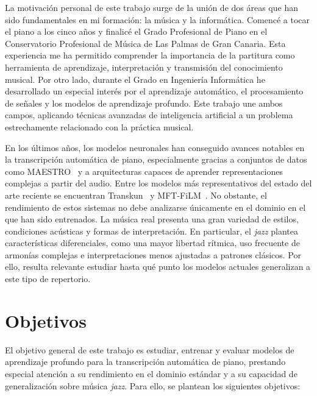 \documentclass[11pt,spanish,listoffigures,listoftables]{tfgetsinf}
\begin{document}
La motivación personal de este trabajo surge de la unión de dos áreas que han
sido fundamentales en mi formación: la música y la informática. Comencé a tocar
el piano a los cinco años y finalicé el Grado Profesional de Piano en el
Conservatorio Profesional de Música de Las Palmas de Gran Canaria. Esta
experiencia me ha permitido comprender la importancia de la partitura como
herramienta de aprendizaje, interpretación y transmisión del conocimiento
musical. Por otro lado, durante el Grado en Ingeniería Informática he
desarrollado un especial interés por el aprendizaje automático, el procesamiento
de señales y los modelos de aprendizaje profundo. Este trabajo une ambos
campos, aplicando técnicas avanzadas de inteligencia artificial a un problema
estrechamente relacionado con la práctica musical.

En los últimos años, los modelos neuronales han conseguido avances notables en
la transcripción automática de piano, especialmente gracias a conjuntos de datos
como MAESTRO~\cite{magenta2020maestrov3} y a arquitecturas capaces de aprender representaciones complejas a
partir del audio. Entre los modelos más representativos del estado del arte reciente se encuentran Transkun~\cite{yan2024transkun} y MFT-FiLM~\cite{wang2025mftfilm}. No obstante, el rendimiento de estos sistemas no debe
analizarse únicamente en el dominio en el que han sido entrenados. La música real
presenta una gran variedad de estilos, condiciones acústicas y formas de
interpretación. En particular, el \textit{jazz} plantea características
diferenciales, como una mayor libertad rítmica, uso frecuente de armonías
complejas e interpretaciones menos ajustadas a patrones clásicos. Por ello,
resulta relevante estudiar hasta qué punto los modelos actuales generalizan a
este tipo de repertorio.

\section{Objetivos}

El objetivo general de este trabajo es estudiar, entrenar y evaluar modelos de aprendizaje
profundo para la transcripción automática de piano, prestando especial atención
a su rendimiento en el dominio estándar y a su capacidad de generalización sobre
música \textit{jazz}. Para ello, se plantean los siguientes objetivos:
\end{document}
